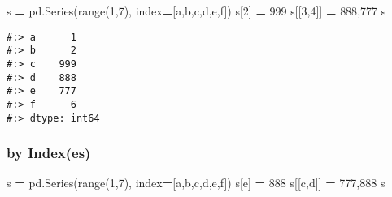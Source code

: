\documentclass[
]{book}
\newenvironment{Shaded}{\begin{snugshade}}{\end{snugshade}}
\newcommand{\BuiltInTok}[1]{#1}
\newcommand{\DecValTok}[1]{\textcolor[rgb]{0.06,0.06,0.06}{#1}}
\newcommand{\NormalTok}[1]{#1}
\newcommand{\OperatorTok}[1]{\textcolor[rgb]{0.43,0.43,0.43}{\textbf{#1}}}
\newcommand{\StringTok}[1]{\textcolor[rgb]{0.5,0.5,0.5}{#1}}
\begin{document}
\begin{Shaded}
\begin{Highlighting}[]
\NormalTok{s }\OperatorTok{=}\NormalTok{ pd.Series(}\BuiltInTok{range}\NormalTok{(}\DecValTok{1}\NormalTok{,}\DecValTok{7}\NormalTok{), index}\OperatorTok{=}\NormalTok{[}\StringTok{\textquotesingle{}a\textquotesingle{}}\NormalTok{,}\StringTok{\textquotesingle{}b\textquotesingle{}}\NormalTok{,}\StringTok{\textquotesingle{}c\textquotesingle{}}\NormalTok{,}\StringTok{\textquotesingle{}d\textquotesingle{}}\NormalTok{,}\StringTok{\textquotesingle{}e\textquotesingle{}}\NormalTok{,}\StringTok{\textquotesingle{}f\textquotesingle{}}\NormalTok{])}
\NormalTok{s[}\DecValTok{2}\NormalTok{] }\OperatorTok{=} \DecValTok{999}
\NormalTok{s[[}\DecValTok{3}\NormalTok{,}\DecValTok{4}\NormalTok{]] }\OperatorTok{=} \DecValTok{888}\NormalTok{,}\DecValTok{777}
\NormalTok{s}
\end{Highlighting}
\end{Shaded}

\begin{verbatim}
#:> a      1
#:> b      2
#:> c    999
#:> d    888
#:> e    777
#:> f      6
#:> dtype: int64
\end{verbatim}

\hypertarget{by-indexes-1}{%
\subsubsection{by Index(es)}\label{by-indexes-1}}

\begin{Shaded}
\begin{Highlighting}[]
\NormalTok{s }\OperatorTok{=}\NormalTok{ pd.Series(}\BuiltInTok{range}\NormalTok{(}\DecValTok{1}\NormalTok{,}\DecValTok{7}\NormalTok{), index}\OperatorTok{=}\NormalTok{[}\StringTok{\textquotesingle{}a\textquotesingle{}}\NormalTok{,}\StringTok{\textquotesingle{}b\textquotesingle{}}\NormalTok{,}\StringTok{\textquotesingle{}c\textquotesingle{}}\NormalTok{,}\StringTok{\textquotesingle{}d\textquotesingle{}}\NormalTok{,}\StringTok{\textquotesingle{}e\textquotesingle{}}\NormalTok{,}\StringTok{\textquotesingle{}f\textquotesingle{}}\NormalTok{])}
\NormalTok{s[}\StringTok{\textquotesingle{}e\textquotesingle{}}\NormalTok{] }\OperatorTok{=} \DecValTok{888}
\NormalTok{s[[}\StringTok{\textquotesingle{}c\textquotesingle{}}\NormalTok{,}\StringTok{\textquotesingle{}d\textquotesingle{}}\NormalTok{]] }\OperatorTok{=} \DecValTok{777}\NormalTok{,}\DecValTok{888}
\NormalTok{s}
\end{Highlighting}
\end{Shaded}
\end{document}
